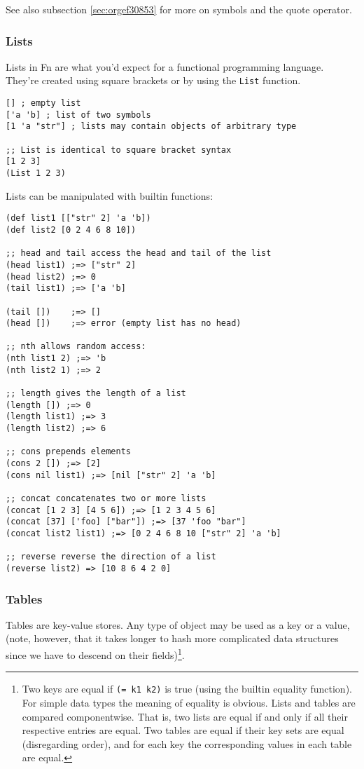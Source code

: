 \documentclass[11pt]{article}
\begin{document}
See also subsection \ref{sec:orgef30853} for more on symbols and the quote operator.


\subsubsection{Lists}
\label{sec:org73f773f}

Lists in Fn are what you'd expect for a functional programming language. They're
created using square brackets or by using the \texttt{List} function.

\begin{verbatim}
[] ; empty list
['a 'b] ; list of two symbols
[1 'a "str"] ; lists may contain objects of arbitrary type

;; List is identical to square bracket syntax
[1 2 3]
(List 1 2 3)
\end{verbatim}

Lists can be manipulated with builtin functions:

\begin{verbatim}
(def list1 [["str" 2] 'a 'b])
(def list2 [0 2 4 6 8 10])

;; head and tail access the head and tail of the list
(head list1) ;=> ["str" 2]
(head list2) ;=> 0
(tail list1) ;=> ['a 'b]

(tail [])    ;=> []
(head [])    ;=> error (empty list has no head)

;; nth allows random access:
(nth list1 2) ;=> 'b
(nth list2 1) ;=> 2

;; length gives the length of a list
(length []) ;=> 0
(length list1) ;=> 3
(length list2) ;=> 6

;; cons prepends elements
(cons 2 []) ;=> [2]
(cons nil list1) ;=> [nil ["str" 2] 'a 'b]

;; concat concatenates two or more lists
(concat [1 2 3] [4 5 6]) ;=> [1 2 3 4 5 6]
(concat [37] ['foo] ["bar"]) ;=> [37 'foo "bar"]
(concat list2 list1) ;=> [0 2 4 6 8 10 ["str" 2] 'a 'b]

;; reverse reverse the direction of a list
(reverse list2) => [10 8 6 4 2 0]
\end{verbatim}


\subsubsection{Tables}
\label{sec:org85de6b3}

Tables are key-value stores. Any type of object may be used as a key or a value,
(note, however, that it takes longer to hash more complicated data structures
since we have to descend on their fields)\footnote{Two keys are equal if \texttt{(= k1 k2)} is true (using the builtin
equality function). For simple data types the meaning of equality is obvious.
Lists and tables are compared componentwise. That is, two lists are equal if and
only if all their respective entries are equal. Two tables are equal if their
key sets are equal (disregarding order), and for each key the corresponding
values in each table are equal.}.
\end{document}
